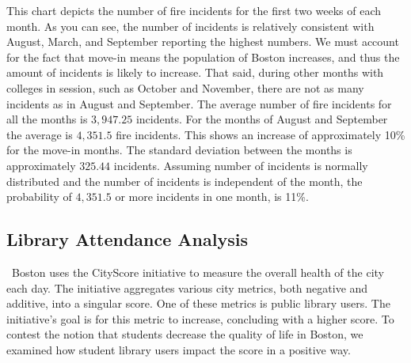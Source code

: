 \documentclass[journal, a4paper]{IEEEtran}
\begin{document}
This chart depicts the number of fire incidents for the first two weeks of each month. As you can see, the number of incidents is relatively consistent with August, March, and September reporting the highest numbers. 
We must account for the fact that move-in means the population of Boston increases, and thus the amount of incidents is likely to increase. That said, during other months with colleges in session, such as October and November, there are not as many incidents as in August and September.
The average number of fire incidents for all the months is $3,947.25$ incidents. For the months of August and September the average is $4,351.5$ fire incidents. This shows an increase of approximately 10\% for the move-in months. The standard deviation between the months is approximately $325.44$ incidents. Assuming number of incidents is normally distributed and the number of incidents is independent of the month, the probability of $4,351.5$ or more incidents in one month, is 11\%.
\subsection{Library Attendance Analysis}

\ Boston uses the CityScore initiative to measure the overall health of the city each day. The initiative aggregates various city metrics, both negative and additive, into a singular score. One of these metrics is public library users. The initiative’s goal is for this metric to increase, concluding with a higher score. To contest the notion that students decrease the quality of life in Boston, we examined how student library users impact the score in a positive way.
\newline
\tab
\end{document}

